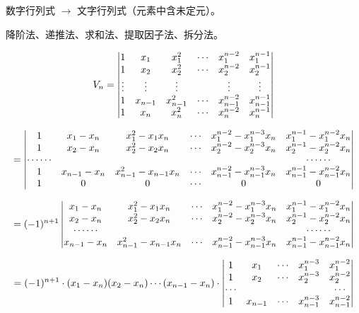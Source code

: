 数字行列式 $\longrightarrow$ 文字行列式（元素中含未定元）。

降阶法、递推法、求和法、提取因子法、拆分法。

\begin{example}
\[
\fitmath{$\displaystyle
V_n=\begin{vmatrix}
1&x_1&x_1^2&\cdots&x_1^{n-2}&x_1^{n-1}\\
1&x_2&x_2^2&\cdots&x_2^{n-2}&x_2^{n-1}\\
\vdots&\vdots&\vdots& &\vdots&\vdots\\
1&x_{n-1}&x_{n-1}^2&\cdots&x_{n-1}^{n-2}&x_{n-1}^{n-1}\\
1&x_n&x_n^2&\cdots&x_n^{n-2}&x_n^{n-1}
\end{vmatrix}$}
\]
\end{example}


\[
\fitmath{$\displaystyle
=\begin{vmatrix}
1&x_1-x_n&x_1^2-x_1x_n&\cdots&x_1^{n-2}-x_1^{n-3}x_n&x_1^{n-1}-x_1^{n-2}x_n\\
1&x_2-x_n&x_2^2-x_2x_n&\cdots&x_2^{n-2}-x_2^{n-3}x_n&x_2^{n-1}-x_2^{n-2}x_n\\
\cdots\cdots& & & & &\cdots\cdots\\
1&x_{n-1}-x_n&x_{n-1}^2-x_{n-1}x_n&\cdots&x_{n-1}^{n-2}-x_{n-1}^{n-3}x_n&x_{n-1}^{n-1}-x_{n-1}^{n-2}x_n\\
1&0&0&\cdots&0&0
\end{vmatrix}$}
\]

\[
\fitmath{$\displaystyle
=(-1)^{n+1}\begin{vmatrix}
x_1-x_n&x_1^2-x_1x_n&\cdots&x_1^{n-2}-x_1^{n-3}x_n&x_1^{n-1}-x_1^{n-2}x_n\\
x_2-x_n&x_2^2-x_2x_n&\cdots&x_2^{n-2}-x_2^{n-3}x_n&x_2^{n-1}-x_2^{n-2}x_n\\
\cdots\cdots& & & &\cdots\cdots\\
x_{n-1}-x_n&x_{n-1}^2-x_{n-1}x_n&\cdots&x_{n-1}^{n-2}-x_{n-1}^{n-3}x_n&x_{n-1}^{n-1}-x_{n-1}^{n-2}x_n
\end{vmatrix}$}
\]

\[
\fitmath{$\displaystyle
=(-1)^{n+1}\cdot(x_1-x_n)(x_2-x_n)\cdots(x_{n-1}-x_n)\cdot
\begin{vmatrix}
1&x_1&\cdots&x_1^{n-3}&x_1^{n-2}\\
1&x_2&\cdots&x_2^{n-3}&x_2^{n-2}\\
\cdots& & & &\cdots\\
1&x_{n-1}&\cdots&x_{n-1}^{n-3}&x_{n-1}^{n-2}
\end{vmatrix}$}
\]

